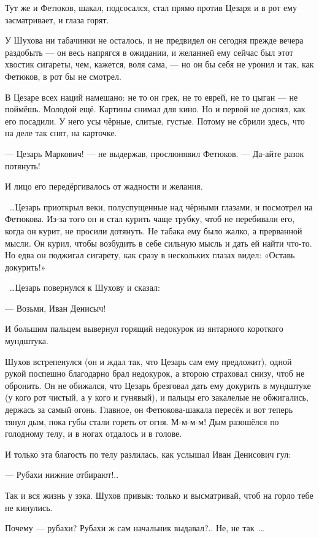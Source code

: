 Тут же и Фетюков, шакал, подсосался, стал прямо против Цезаря и в рот ему засматривает, и 
глаза горят.

У Шухова ни табачинки не осталось, и не предвидел он сегодня прежде вечера раздобыть --- он 
весь напрягся в ожидании, и желанней ему сейчас был этот хвостик сигареты, чем, кажется, воля 
сама, --- но он бы себя не уронил и так, как Фетюков, в рот бы не смотрел.

В Цезаре всех наций намешано: не то он грек, не то еврей, не то цыган --- не поймёшь. Молодой ещё. 
Картины снимал для кино. Но и первой не доснял, как его посадили. У него усы чёрные, слитые, 
густые. Потому не сбрили здесь, что на деле так снят, на карточке.

--- Цезарь Маркович! --- не выдержав, прослюнявил Фетюков. --- Да-айте разок потянуть!

И лицо его передёргивалось от жадности и желания.

~\dots{}Цезарь приоткрыл веки, полуспущенные над чёрными глазами, и посмотрел на Фетюкова. Из-за 
того он и стал курить чаще трубку, чтоб не перебивали его, когда он курит, не просили 
дотянуть. Не табака ему было жалко, а прерванной мысли. Он курил, чтобы возбудить в себе 
сильную мысль и дать ей найти что-то. Но едва он поджигал сигарету, как сразу в нескольких 
глазах видел: «Оставь докурить!»

~\dots{}Цезарь повернулся к Шухову и сказал:

--- Возьми, Иван Денисыч!

И большим пальцем вывернул горящий недокурок из янтарного короткого мундштука.

Шухов встрепенулся (он и ждал так, что Цезарь сам ему предложит), одной рукой поспешно 
благодарно брал недокурок, а второю страховал снизу, чтоб не обронить. Он не обижался, что 
Цезарь брезговал дать ему докурить в мундштуке (у кого рот чистый, а у кого и гунявый), и 
пальцы его закалелые не обжигались, держась за самый огонь. Главное, он Фетюкова-шакала 
пересёк и вот теперь тянул дым, пока губы стали гореть от огня. М-м-м-м! Дым разошёлся по 
голодному телу, и в ногах отдалось и в голове.

И только эта благость по телу разлилась, как услышал Иван Денисович гул:

--- Рубахи нижние отбирают!..

Так и вся жизнь у зэка. Шухов привык: только и высматривай, чтоб на горло тебе не кинулись.

Почему --- рубахи? Рубахи ж сам начальник выдавал?.. Не, не так~\dots{}

